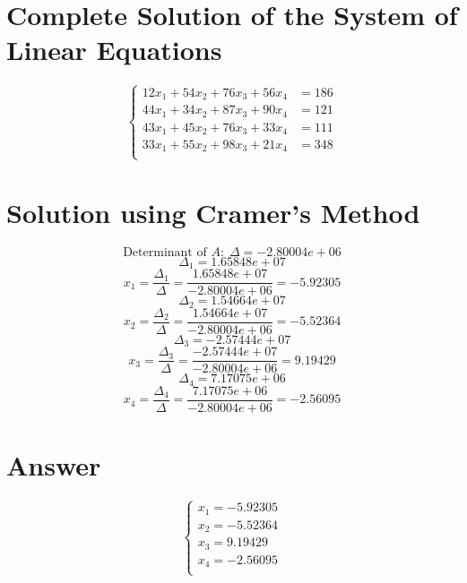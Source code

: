 \documentclass{article}
\begin{document}
\section*{Complete Solution of the System of Linear Equations}
\begin{equation}
\left\{\begin{array}{rrrr}
12x_{1} +54x_{2} +76x_{3} +56x_{4}  &= 186 \\
44x_{1} +34x_{2} +87x_{3} +90x_{4}  &= 121 \\
43x_{1} +45x_{2} +76x_{3} +33x_{4}  &= 111 \\
33x_{1} +55x_{2} +98x_{3} +21x_{4}  &= 348 \\
\end{array}\right.
\end{equation}
\section*{Solution using Cramer's Method}
\begin{equation}
\text{Determinant of } A: \; \Delta = -2.80004e+06
\end{equation}
\begin{equation}
\Delta_{1} = 1.65848e+07
\end{equation}
\begin{equation}
x_{1} = \frac{\Delta_{1}}{\Delta} = \frac{1.65848e+07}{-2.80004e+06} = -5.92305
\end{equation}
\begin{equation}
\Delta_{2} = 1.54664e+07
\end{equation}
\begin{equation}
x_{2} = \frac{\Delta_{2}}{\Delta} = \frac{1.54664e+07}{-2.80004e+06} = -5.52364
\end{equation}
\begin{equation}
\Delta_{3} = -2.57444e+07
\end{equation}
\begin{equation}
x_{3} = \frac{\Delta_{3}}{\Delta} = \frac{-2.57444e+07}{-2.80004e+06} = 9.19429
\end{equation}
\begin{equation}
\Delta_{4} = 7.17075e+06
\end{equation}
\begin{equation}
x_{4} = \frac{\Delta_{4}}{\Delta} = \frac{7.17075e+06}{-2.80004e+06} = -2.56095
\end{equation}
\section*{Answer}
\begin{equation}
\left\{\begin{array}{r}
x_{1} = -5.92305\\
x_{2} = -5.52364\\
x_{3} = 9.19429\\
x_{4} = -2.56095\\
\end{array}\right.
\end{equation}
\end{document}
